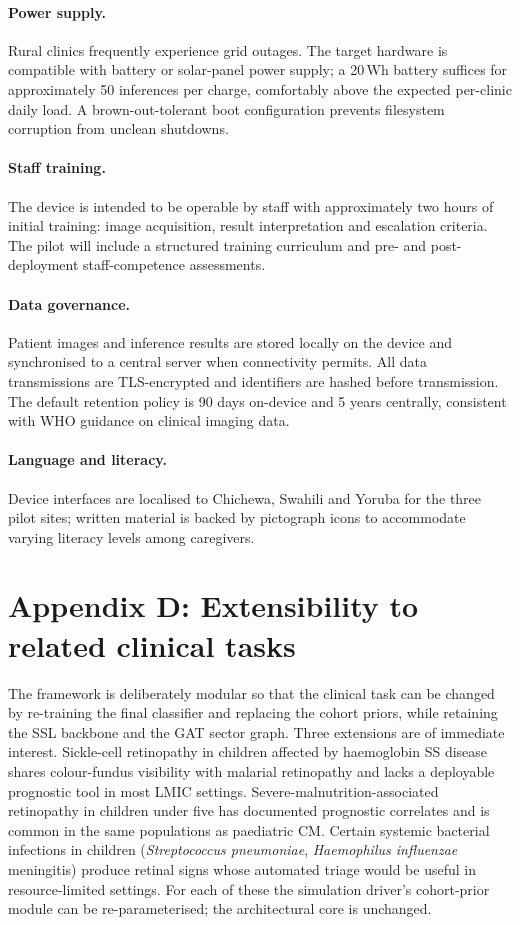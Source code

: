 \documentclass[twocolumn,10pt]{article}
\begin{document}
\paragraph{Power supply.}
Rural clinics frequently experience grid outages. The target
hardware is compatible with battery or solar-panel power supply;
a 20\,Wh battery suffices for approximately 50 inferences per
charge, comfortably above the expected per-clinic daily load.
A brown-out-tolerant boot configuration prevents filesystem
corruption from unclean shutdowns.

\paragraph{Staff training.}
The device is intended to be operable by staff with approximately
two hours of initial training: image acquisition, result
interpretation and escalation criteria. The pilot will include
a structured training curriculum and pre- and post-deployment
staff-competence assessments.

\paragraph{Data governance.}
Patient images and inference results are stored locally on the
device and synchronised to a central server when connectivity
permits. All data transmissions are TLS-encrypted and
identifiers are hashed before transmission. The default retention
policy is 90 days on-device and 5 years centrally, consistent
with WHO guidance on clinical imaging data.

\paragraph{Language and literacy.}
Device interfaces are localised to Chichewa, Swahili and Yoruba
for the three pilot sites; written material is backed by
pictograph icons to accommodate varying literacy levels among
caregivers.

\section*{Appendix D: Extensibility to related clinical tasks}
\label{app:extensions}
The framework is deliberately modular so that the clinical task
can be changed by re-training the final classifier and
replacing the cohort priors, while retaining the SSL backbone
and the GAT sector graph. Three extensions are of immediate
interest. Sickle-cell retinopathy in children affected by
haemoglobin SS disease shares colour-fundus visibility with
malarial retinopathy and lacks a deployable prognostic tool in
most LMIC settings. Severe-malnutrition-associated retinopathy
in children under five has documented prognostic correlates and
is common in the same populations as paediatric CM. Certain
systemic bacterial infections in children (\emph{Streptococcus
pneumoniae}, \emph{Haemophilus influenzae} meningitis) produce
retinal signs whose automated triage would be useful in
resource-limited settings. For each of these the simulation
driver's cohort-prior module can be re-parameterised; the
architectural core is unchanged.
\end{document}

